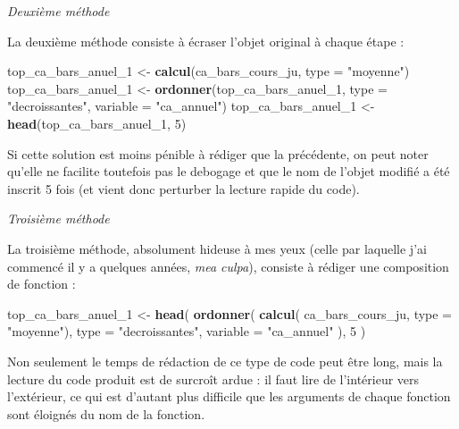 \documentclass[
  11pt,
]{book}
\newenvironment{Shaded}{\begin{snugshade}}{\end{snugshade}}
\newcommand{\DataTypeTok}[1]{\textcolor[rgb]{0.13,0.29,0.53}{#1}}
\newcommand{\DecValTok}[1]{\textcolor[rgb]{0.00,0.00,0.81}{#1}}
\newcommand{\KeywordTok}[1]{\textcolor[rgb]{0.13,0.29,0.53}{\textbf{#1}}}
\newcommand{\NormalTok}[1]{#1}
\newcommand{\StringTok}[1]{\textcolor[rgb]{0.31,0.60,0.02}{#1}}
\numberwithin{equation}{section}
\numberwithin{countremarque}{section}
\begin{document}
\emph{Deuxième méthode}

La deuxième méthode consiste à écraser l'objet original à chaque étape :

\begin{Shaded}
\begin{Highlighting}[]
\NormalTok{top\_ca\_bars\_anuel\_}\DecValTok{1}\NormalTok{ \textless{}{-}}\StringTok{ }\KeywordTok{calcul}\NormalTok{(ca\_bars\_cours\_ju, }\DataTypeTok{type =} \StringTok{"moyenne"}\NormalTok{)}
\NormalTok{top\_ca\_bars\_anuel\_}\DecValTok{1}\NormalTok{ \textless{}{-}}\StringTok{ }\KeywordTok{ordonner}\NormalTok{(top\_ca\_bars\_anuel\_}\DecValTok{1}\NormalTok{,}
                            \DataTypeTok{type =} \StringTok{"decroissantes"}\NormalTok{, }\DataTypeTok{variable =} \StringTok{"ca\_annuel"}\NormalTok{)}
\NormalTok{top\_ca\_bars\_anuel\_}\DecValTok{1}\NormalTok{ \textless{}{-}}\StringTok{ }\KeywordTok{head}\NormalTok{(top\_ca\_bars\_anuel\_}\DecValTok{1}\NormalTok{, }\DecValTok{5}\NormalTok{)}
\end{Highlighting}
\end{Shaded}

Si cette solution est moins pénible à rédiger que la précédente, on peut noter qu'elle ne facilite toutefois pas le debogage et que le nom de l'objet modifié a été inscrit 5 fois (et vient donc perturber la lecture rapide du code).

\emph{Troisième méthode}

La troisième méthode, absolument hideuse à mes yeux (celle par laquelle j'ai commencé il y a quelques années, \emph{mea culpa}), consiste à rédiger une composition de fonction :

\begin{Shaded}
\begin{Highlighting}[]
\NormalTok{top\_ca\_bars\_anuel\_}\DecValTok{1}\NormalTok{ \textless{}{-}}\StringTok{ }
\StringTok{  }\KeywordTok{head}\NormalTok{(}
    \KeywordTok{ordonner}\NormalTok{(}
      \KeywordTok{calcul}\NormalTok{(}
\NormalTok{        ca\_bars\_cours\_ju, }\DataTypeTok{type =} \StringTok{"moyenne"}\NormalTok{),}
      \DataTypeTok{type =} \StringTok{"decroissantes"}\NormalTok{, }\DataTypeTok{variable =} \StringTok{"ca\_annuel"}
\NormalTok{    ), }
    \DecValTok{5}
\NormalTok{  )}
\end{Highlighting}
\end{Shaded}

Non seulement le temps de rédaction de ce type de code peut être long, mais la lecture du code produit est de surcroît ardue : il faut lire de l'intérieur vers l'extérieur, ce qui est d'autant plus difficile que les arguments de chaque fonction sont éloignés du nom de la fonction.
\end{document}
